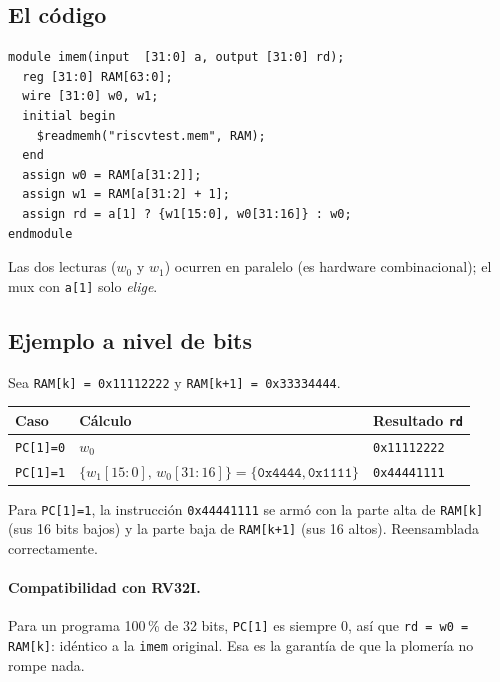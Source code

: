 \documentclass[11pt]{article}
\newcommand{\code}[1]{\texttt{#1}}
\begin{document}
\subsection{El código}

\begin{center}
\begin{minipage}{0.92\linewidth}
\begin{verbatim}
module imem(input  [31:0] a, output [31:0] rd);
  reg [31:0] RAM[63:0];
  wire [31:0] w0, w1;
  initial begin
    $readmemh("riscvtest.mem", RAM);
  end
  assign w0 = RAM[a[31:2]];
  assign w1 = RAM[a[31:2] + 1];
  assign rd = a[1] ? {w1[15:0], w0[31:16]} : w0;
endmodule
\end{verbatim}
\end{minipage}
\end{center}

\noindent
Las dos lecturas ($w_0$ y $w_1$) ocurren en paralelo (es hardware
combinacional); el mux con \code{a[1]} solo \emph{elige}.

\subsection{Ejemplo a nivel de bits}

Sea \code{RAM[k] = 0x11112222} y \code{RAM[k+1] = 0x33334444}.

\begin{center}
\begin{tabular}{@{}lll@{}}
\toprule
Caso & Cálculo & Resultado \code{rd} \\
\midrule
\code{PC[1]=0} & $w_0$ & \code{0x11112222} \\
\code{PC[1]=1} & $\{w_1[15{:}0],\, w_0[31{:}16]\} = \{\code{0x4444},\code{0x1111}\}$ & \code{0x44441111} \\
\bottomrule
\end{tabular}
\end{center}

\noindent
Para \code{PC[1]=1}, la instrucción \code{0x44441111} se armó con la parte alta de
\code{RAM[k]} (sus 16 bits bajos) y la parte baja de \code{RAM[k+1]} (sus 16
altos). Reensamblada correctamente.

\paragraph{Compatibilidad con RV32I.} Para un programa 100\,\% de 32 bits,
\code{PC[1]} es siempre 0, así que \code{rd = w0 = RAM[k]}: idéntico a la
\code{imem} original. Esa es la garantía de que la plomería no rompe nada.
\end{document}
